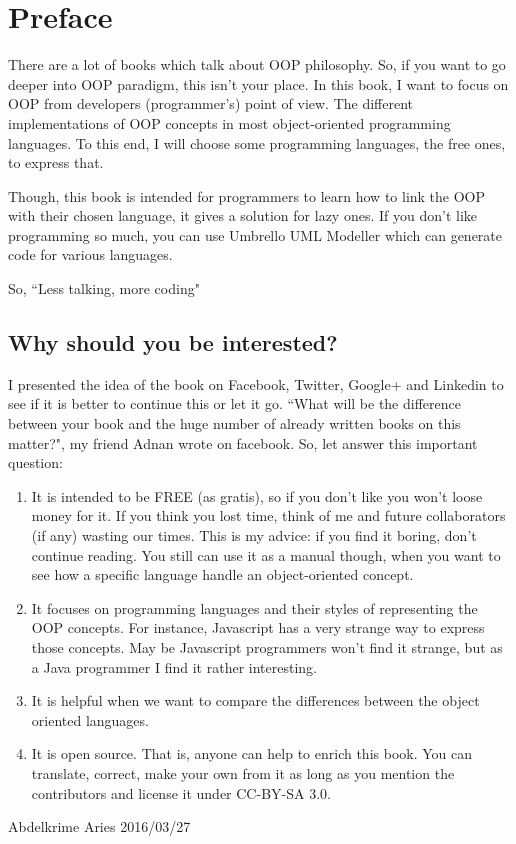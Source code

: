 \documentclass[12pt]{book}
\begin{document}
	\chapter*{Preface}
\fi

There are a lot of books which talk about OOP philosophy. 
So, if you want to go deeper into OOP paradigm, this isn't your place. 
In this book, I want to focus on OOP from developers (programmer's) point of view.
The different implementations of OOP concepts in most object-oriented programming languages.
To this end, I will choose some programming languages, the free ones, to express that.

Though, this book is intended for programmers to learn how to link the OOP with their chosen language, it gives a solution for lazy ones. 
If you don't like programming so much, you can use Umbrello UML Modeller which can generate code for various languages. 

\vfill
\begin{flushright}
So, ``Less talking, more coding"
\end{flushright}

\newpage

\section*{Why should you be interested?}
I presented the idea of the book on Facebook, Twitter, Google+ and Linkedin to see if it is better to continue this or let it go. 
``What will be the difference between your book and the huge number of already written books on this matter?", my friend Adnan wrote on facebook. 
So, let answer this important question:
\begin{enumerate}
\item It is intended to be FREE (as gratis), so if you don't like you won't loose money for it. 
If you think you lost time, think of me and future collaborators (if any) wasting our times. 
This is my advice: if you find it boring, don't continue reading. 
You still can use it as a manual though, when you want to see how a specific language handle an object-oriented concept.

\item It focuses on programming languages and their styles of representing the OOP concepts. 
For instance, Javascript has a very strange way to express those concepts. 
May be Javascript programmers won't find it strange, but as a Java programmer I find it rather interesting.

\item It is helpful when we want to compare the differences between the object oriented languages.

\item It is open source. 
That is, anyone can help to enrich this book. 
You can translate, correct, make your own from it as long as you mention the contributors and license it under CC-BY-SA 3.0.

\end{enumerate}
\vfill
\begin{flushright}
Abdelkrime Aries 2016/03/27
\end{flushright}

\ifx\wholebook\relax\else
% 
% 
	
\end{document}
